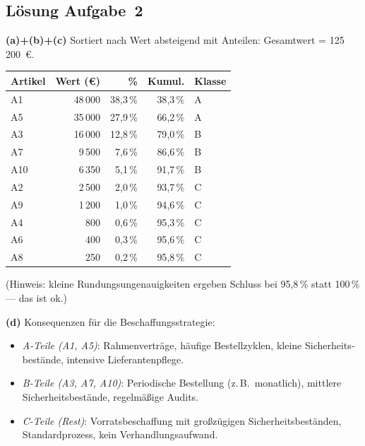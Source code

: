\documentclass[11pt, a4paper]{article}
\begin{document}
\subsection*{Lösung Aufgabe~2}
\begin{loesung}
\textbf{(a)+(b)+(c)} Sortiert nach Wert absteigend mit Anteilen:
Gesamtwert = 125\,200~€.

\begin{center}
\begin{tabular}{lrrrl}
\toprule
\textbf{Artikel} & \textbf{Wert (€)} & \textbf{\%} & \textbf{Kumul.} & \textbf{Klasse}\\
\midrule
A1 & 48\,000 & 38{,}3\,\% & 38{,}3\,\% & A\\
A5 & 35\,000 & 27{,}9\,\% & 66{,}2\,\% & A\\
A3 & 16\,000 & 12{,}8\,\% & 79{,}0\,\% & B\\
A7 & 9\,500 & 7{,}6\,\% & 86{,}6\,\% & B\\
A10 & 6\,350 & 5{,}1\,\% & 91{,}7\,\% & B\\
A2 & 2\,500 & 2{,}0\,\% & 93{,}7\,\% & C\\
A9 & 1\,200 & 1{,}0\,\% & 94{,}6\,\% & C\\
A4 & 800 & 0{,}6\,\% & 95{,}3\,\% & C\\
A6 & 400 & 0{,}3\,\% & 95{,}6\,\% & C\\
A8 & 250 & 0{,}2\,\% & 95{,}8\,\% & C\\
\bottomrule
\end{tabular}
\end{center}

(Hinweis: kleine Rundungs­ungenauigkeiten ergeben Schluss bei 95{,}8\,\% statt 100\,\% --- das ist ok.)

\textbf{(d)} Konsequenzen für die Beschaffungs­strategie:
\begin{itemize}[itemsep=0pt]
  \item \emph{A-Teile (A1, A5)}: Rahmenverträge, häufige Bestellzyklen, kleine Sicherheits­bestände, intensive Lieferantenpflege.
  \item \emph{B-Teile (A3, A7, A10)}: Periodische Bestellung (z.\,B.\ monatlich), mittlere Sicherheits­bestände, regelmäßige Audits.
  \item \emph{C-Teile (Rest)}: Vorratsbeschaffung mit großzügigen Sicherheits­beständen, Standardprozess, kein Verhandlungsaufwand.
\end{itemize}
\end{loesung}
\end{document}
